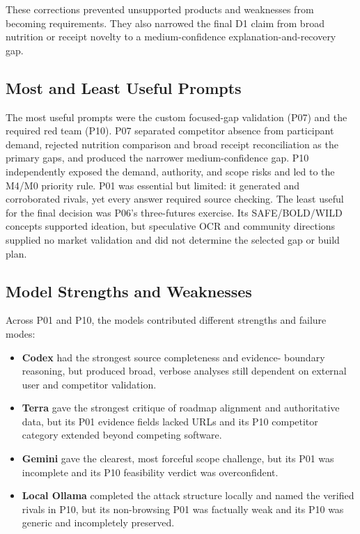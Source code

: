 \documentclass[sigconf]{acmart}
\begin{document}
These corrections prevented unsupported products and weaknesses from becoming
requirements. They also narrowed the final D1 claim from broad nutrition or
receipt novelty to a medium-confidence explanation-and-recovery gap.

\subsection{Most and Least Useful Prompts}

The most useful prompts were the custom focused-gap validation (P07) and the
required red team (P10). P07 separated competitor absence from participant
demand, rejected nutrition comparison and broad receipt reconciliation as the
primary gaps, and produced the narrower medium-confidence gap. P10 independently
exposed the demand, authority, and scope risks and led to the M4/M0 priority
rule. P01 was essential but limited: it generated and corroborated rivals, yet
every answer required source checking. The least useful for the final decision
was P06's three-futures exercise. Its SAFE/BOLD/WILD concepts supported
ideation, but speculative OCR and community directions supplied no market
validation and did not determine the selected gap or build plan.

\subsection{Model Strengths and Weaknesses}

Across P01 and P10, the models contributed different strengths and failure
modes:

\begin{itemize}
  \item \textbf{Codex} had the strongest source completeness and evidence-
  boundary reasoning, but produced broad, verbose analyses still dependent on
  external user and competitor validation.
  \item \textbf{Terra} gave the strongest critique of roadmap alignment and
  authoritative data, but its P01 evidence fields lacked URLs and its P10
  competitor category extended beyond competing software.
  \item \textbf{Gemini} gave the clearest, most forceful scope challenge, but
  its P01 was incomplete and its P10 feasibility verdict was overconfident.
  \item \textbf{Local Ollama} completed the attack structure locally and named
  the verified rivals in P10, but its non-browsing P01 was factually weak and
  its P10 was generic and incompletely preserved.
\end{itemize}
\end{document}
